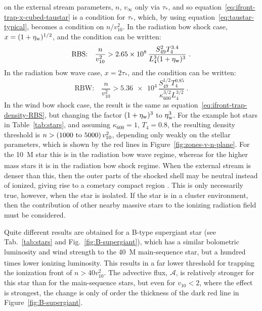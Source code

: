 on the external stream parameters, \(n\), \(v_\infty\) only via
\(\tau_*\), and so equation~\eqref{eq:ifront-trap-x-cubed-taustar} is a
condition for \(\tau_*\), which, by using
equation~\eqref{eq:taustar-typical}, becomes a condition on
\(n / v_{10}^2\).  In the radiation bow shock case,
\(x = (1 + \eta_{\text{w}})^{1/2}\), and the condition can be written:
\begin{equation}
  \label{eq:ifront-trap-density-RBS}
  \text{RBS:}\quad
  \frac{n}{v_{10}^2} > \num{2.65e8} \, \frac{S_{49}^2 T_4^{3.4}}{L_4^3 (1 + \eta_{\text{w}})^3} \ .
\end{equation}
In the radiation bow wave case, \(x = 2\tau_*\), and the condition can be
written:
\begin{equation}
  \label{eq:ifront-trap-taustar-RBW}
  \text{RBW:}\quad
  \frac{n}{v_{10}^2} > \num{5.36e4} \, \frac{S_{49}^{1/2} T_4^{0.85} }{\kappa_{600}^{3/2} L_4^{3/2}} \ . 
\end{equation}
In the wind bow shock case, the result is the same as
equation~\eqref{eq:ifront-trap-density-RBS}, but changing the factor
\((1 + \eta_{\text{w}})^3\) to \(\eta_{\text{w}}^3\).  For the example hot stars in
Table~\ref{tab:stars}, and assuming \(\kappa_{600} = 1\),
\(T_4 = 0.8\), the resulting density threshold is
\(n > (\text{\numrange{1000}{5000}})\, v_{10}^2\), depending only
weakly on the stellar parameters, which is shown by the red lines in
Figure~\ref{fig:zones-v-n-plane}.  For the \SI{10}{M_\odot} star this is
in the radiation bow wave regime, whereas for the higher mass stars it
is in the radiation bow shock regime.  When the external stream is
denser than this, then the outer parts of the shocked shell may be
neutral instead of ionized, giving rise to a cometary compact \hii{}
region \citep{Mac-Low:1991a, Arthur:2006a}.  This is only necessarily
true, however, when the star is isolated.  If the star is in a cluster
environment, then the contribution of other nearby massive stars to
the ionizing radiation field must be considered.

Quite different results are obtained for a B-type supergiant star (see
Tab.~\ref{tab:stars} and Fig.~\ref{fig:B-supergiant}), which has a
similar bolometric luminosity and wind strength to the \SI{40}{M_\odot}
main-sequence star, but a hundred times lower ionizing luminosity.
This results in a far lower threshold for trapping the ionization
front of \(n > 40 v_{10}^2\).  The advective flux, \(\mathcal{A}\), is
relatively stronger for this star than for the main-sequence stars, but
even for \(v_{10} < 2\), where the effect is strongest, the change is
only of order the thickness of the dark red line in
Figure~\ref{fig:B-supergiant}.


